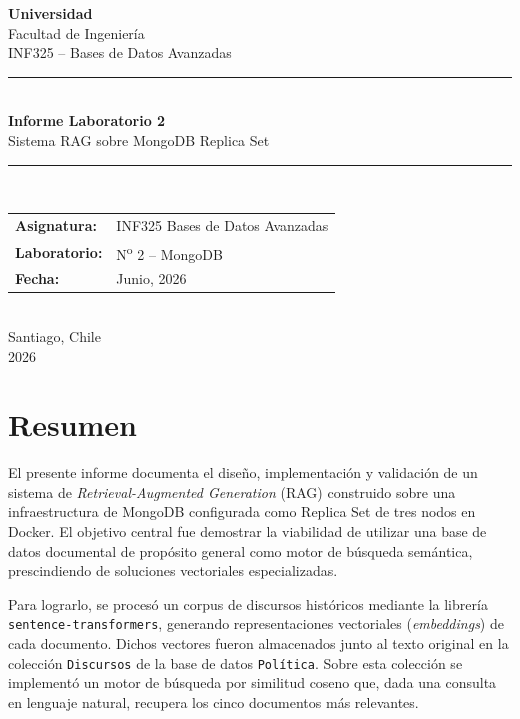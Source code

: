 \documentclass[12pt,a4paper]{article}
\begin{document}

\begin{titlepage}
    \centering
    \vspace*{1.5cm}
    {\Large \textbf{Universidad}\\[0.3cm]
    \large Facultad de Ingeniería\\[0.2cm]
    \large INF325 -- Bases de Datos Avanzadas}\\[2cm]

    \rule{\textwidth}{1.5pt}\\[0.4cm]
    {\LARGE \textbf{Informe Laboratorio 2}}\\[0.3cm]
    {\Large Sistema RAG sobre MongoDB Replica Set}\\[0.3cm]
    \rule{\textwidth}{1.5pt}\\[2cm]

    \begin{tabular}{ll}
        \textbf{Asignatura:} & INF325 Bases de Datos Avanzadas \\[0.3cm]
        \textbf{Laboratorio:} & N\textsuperscript{o} 2 -- MongoDB \\[0.3cm]
        \textbf{Fecha:} & Junio, 2026 \\
    \end{tabular}\\[3cm]

    \vfill
    {\large Santiago, Chile\\2026}
\end{titlepage}

\tableofcontents
\newpage

\section*{Resumen}

El presente informe documenta el diseño, implementación y validación de un sistema de \textit{Retrieval-Augmented Generation} (RAG) construido sobre una infraestructura de MongoDB configurada como Replica Set de tres nodos en Docker. El objetivo central fue demostrar la viabilidad de utilizar una base de datos documental de propósito general como motor de búsqueda semántica, prescindiendo de soluciones vectoriales especializadas.

Para lograrlo, se procesó un corpus de discursos históricos mediante la librería \texttt{sentence-transformers}, generando representaciones vectoriales (\textit{embeddings}) de cada documento. Dichos vectores fueron almacenados junto al texto original en la colección \texttt{Discursos} de la base de datos \texttt{Política}. Sobre esta colección se implementó un motor de búsqueda por similitud coseno que, dada una consulta en lenguaje natural, recupera los cinco documentos más relevantes.
\end{document}

